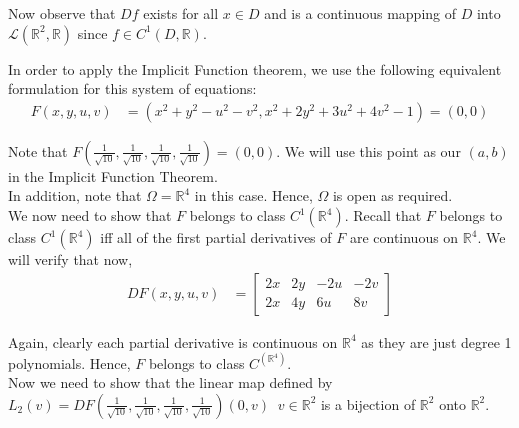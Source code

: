 \documentclass[12pt]{article}
\newenvironment{problem}[2][Problem]{\begin{trivlist}
\item[\hskip \labelsep {\bfseries #1}\hskip \labelsep {\bfseries #2.}]}{\end{trivlist}}
\begin{document}
Now observe that $Df$ exists for all $x \in D$ and is a continuous mapping of $D$ into $\mathscr{L}(\mathbb{R}^2, \mathbb{R})$ since $f \in C^1(D, \mathbb{R})$.

\begin{problem}{4}
\end{problem}

In order to apply the Implicit Function theorem, we use the following equivalent formulation for this system of equations:
\begin{align*}
F(x, y, u, v) &= (x^2 + y^2 - u^2 - v^2, x^2 + 2y^2 + 3u^2 + 4v^2 - 1) = (0, 0)
\end{align*}

Note that $F(\frac{1}{\sqrt{10}}, \frac{1}{\sqrt{10}}, \frac{1}{\sqrt{10}}, \frac{1}{\sqrt{10}}) = (0, 0)$. We will use this point as our $(a, b)$ in the Implicit Function Theorem.\\

In addition, note that $\Omega = \mathbb{R}^4$ in this case. Hence, $\Omega$ is open as required.\\

We now need to show that $F$ belongs to class $C^1(\mathbb{R}^4)$. Recall that $F$ belongs to class $C^1(\mathbb{R}^4)$ iff all of the first partial derivatives of $F$ are continuous on $\mathbb{R}^4$. We will verify that now,
\begin{align*}
DF(x, y, u, v) &= \begin{bmatrix}
2x & 2y & -2u & -2v\\
2x & 4y & 6u & 8v
\end{bmatrix}
\end{align*}

Again, clearly each partial derivative is continuous on $\mathbb{R}^4$ as they are just degree 1 polynomials. Hence, $F$ belongs to class $C^(\mathbb{R}^4)$.\\

Now we need to show that the linear map defined by $L_2(v) = DF(\frac{1}{\sqrt{10}}, \frac{1}{\sqrt{10}}, \frac{1}{\sqrt{10}}, \frac{1}{\sqrt{10}})(0, v) \;\; v \in \mathbb{R}^2$ is a bijection of $\mathbb{R}^2$ onto $\mathbb{R}^2$.\\
\end{document}
